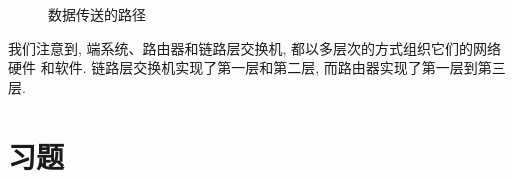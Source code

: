 \documentclass[10pt,UTF8]{book} %
\begin{document}
\begin{figure}[H]
\begin{tikzpicture}[x=0.75pt,y=0.75pt,yscale=-0.95,xscale=0.95]
\end{tikzpicture}
\caption{数据传送的路径}
\end{figure}

我们注意到, 端系统、路由器和链路层交换机, 都以多层次的方式组织它们的网络硬件
和软件. 链路层交换机实现了第一层和第二层, 而路由器实现了第一层到第三层.

\newpage
\section{习题}

\end{document}
